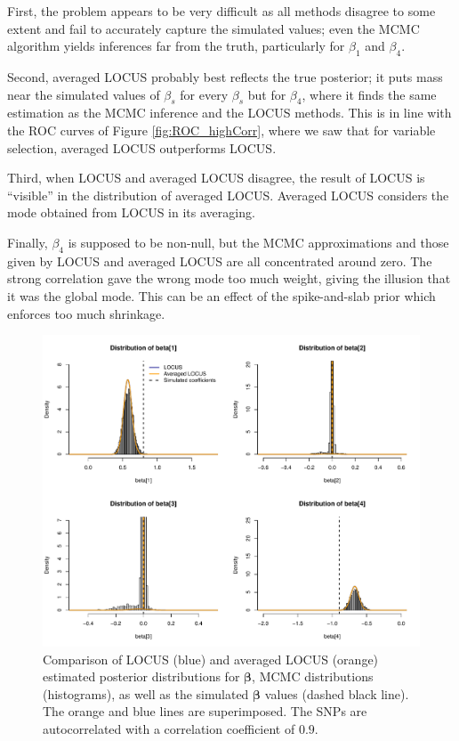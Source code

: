 \documentclass[a4paper, 11pt]{report}
\numberwithin{equation}{chapter}
\begin{document}
First, the problem appears to be very difficult as all methods disagree to some extent and fail to accurately capture the simulated values; even the MCMC algorithm yields inferences far from the truth, particularly for $\beta_1$ and $\beta_4$.

Second, averaged LOCUS probably best reflects the true posterior; it puts mass near the simulated values of $\beta_s$ for every $\beta_s$ but for $\beta_4$, where it finds the same estimation as the MCMC inference and the LOCUS methods. This is in line with the ROC curves of Figure \ref{fig:ROC_highCorr}, where we saw that for variable selection, averaged LOCUS outperforms LOCUS.

Third, when LOCUS and averaged LOCUS disagree, the result of LOCUS is ``visible'' in the distribution of averaged LOCUS. Averaged LOCUS considers the mode obtained from LOCUS in its averaging.

Finally, $\beta_4$ is supposed to be non-null, but the MCMC approximations and those given by LOCUS and averaged LOCUS are all concentrated around zero. The strong correlation gave the wrong mode too much weight, giving the illusion that it was the global mode. This can be an effect of the spike-and-slab prior which enforces too much shrinkage.
\begin{figure}[h]
\centering
\includegraphics[width=\textwidth, bb=0 0 9.8in 8.07in]{images/MCMC_weakcorr.pdf}
\caption{\label{fig:weakCorr} Comparison of LOCUS (blue) and averaged LOCUS (orange) estimated posterior distributions for $\boldsymbol{\beta}$, MCMC distributions (histograms), as well as the simulated $\boldsymbol{\beta}$ values (dashed black line). The orange and blue lines are superimposed. The SNPs are autocorrelated with a correlation coefficient of $0.9$.}
\end{figure}
\end{document}
